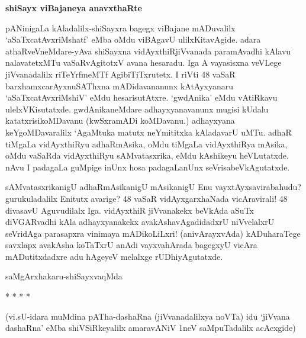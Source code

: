 {\bigskip
\noindent
{\large\bf shiSayx viBajaneya anavxthaRte}}\label{page126}
\medskip

\noindent
pANinigaLa kAladalilx-shiSayxra bagegx viBajane mADuvalilx `aSaTxcatAvxriMshatf' eMba oMdu viBA\-gavU ulilx\-Kita\-vAgide. adara athaRveVneMdare-yAva shiSayxna vidAyxthiRjiVvanada paramAvadhi kAlavu nalava\-tetxMTu vaSaRvAgitotxV avana hesaradu. Iga A vayasisxna veVLege jiVvanadalilx riTeYrfmeMTf Agi\-biTiTxrutetx. I riVti 48 vaSaR barxhamxcarAyxnuSAThxna mADidavananunx kAtAyxyanaru `aSaTxcatAvxriMshiV' eMdu hesa\-risutAtxre. `gwdAnika' eMdu vAtiRkavu ulelxVKisutatxde. gwdAnikaneMdare adhayxyanavanunx mugisi \-kUdalu katatxrisikoMDavanu (kwSxramADi koMDavanu.) adhayxyana keYgoMDavaralilx `AgaMtuka matutx neYmi\-titxka kAladavarU uMTu. adhaR tiMgaLa vidAyxthiRyu adhaRmAsika, oMdu tiMgaLa vidAyxthiRya mAsika, oMdu vaSaRda vidAyxthiRyu sAMvatasxrika, eMdu kAshikeyu heVLutatxde. nAvu I pada\-gaLa guMpige inUnx hosa padagaLanUnx seVrisabeVkAgutatxde.

sAMvatasxrikanigU adhaRmAsikanigU mAsikanigU Enu vayxtAyxsavirabahudu? gurukuladalilx Enitutx\- avarige? 48 vaSaR vidAyxgarxhaNada vicAravirali! 48 diva\-savU Aguvudilalx Iga. vidAyxthiR jiVva\-nakekx beVkAda aSuTx diVGARvadhi kAla adhayx\-yanakekx avakAshavAgadidadxrU niVvelalxrU seVridAga para\-sapxra vini\-maya mADi\-koLiLxri! (anivArayxvAda) kADuharaTege savxlapx avakAsha koTaTxrU anAdi vayxva\-hArada bagegxyU vicAra mADutitxdadxre adu hAgeyeV melalxge rUDhiyAgutatxde. 

\bigskip

\begin{flushright}
saMgArxhakaru-shiSayxvaqMda
\end{flushright}


\begin{center}
* * * *
\end{center}

\medskip

\noindent
(vi.sU-idara muMdina pATha-dashaRna (jiVvanadalilxya noVTa) idu `jiVvana dashaRna' eMba shiVSiRkeyalilx amaravANiV 1neV saMpuTadalilx acAcxgide)
